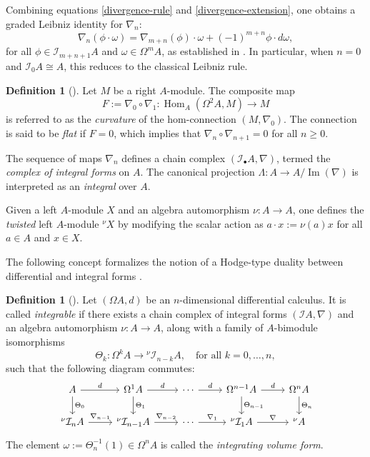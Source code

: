 \documentclass{amsart}
\theoremstyle{definition}
\newtheorem{definition}[theorem]{Definition}
\theoremstyle{remark}
\numberwithin{equation}{section}
\begin{document}
Combining equations \eqref{divergence-rule} and \eqref{divergence-extension}, one obtains a graded Leibniz identity for $\nabla_n$:
\begin{equation}
    \nabla_n(\phi \cdot \omega) = \nabla_{m+n}(\phi) \cdot \omega + (-1)^{m+n} \phi \cdot d\omega,
\end{equation}
for all $\phi \in \mathcal{I}_{m+n+1} A$ and $\omega \in \Omega^m A$, as established in \cite[Lemma 3.2]{Brzezinski2008}. In particular, when $n = 0$ and $\mathcal{I}_0 A \cong A$, this reduces to the classical Leibniz rule.

\begin{definition}[{\cite[Definition 3.4]{Brzezinski2008}}]
Let $M$ be a right $A$-module. The composite map 
\[
F := \nabla_0 \circ \nabla_1: \operatorname{Hom}_A(\Omega^2 A, M) \to M
\]
is referred to as the \emph{curvature} of the hom-connection $(M, \nabla_0)$. The connection is said to be \emph{flat} if $F = 0$, which implies that $\nabla_n \circ \nabla_{n+1} = 0$ for all $n \geq 0$.
\end{definition}

The sequence of maps $\nabla_n$ defines a chain complex $(\mathcal{I}_\bullet A, \nabla)$, termed the \emph{complex of integral forms} on $A$. The canonical projection $\Lambda: A \to A / \operatorname{Im}(\nabla)$ is interpreted as an \emph{integral} over $A$.

Given a left $A$-module $X$ and an algebra automorphism $\nu: A \to A$, one defines the \emph{twisted} left $A$-module ${}^{\nu} X$ by modifying the scalar action as $a \cdot x := \nu(a) x$ for all $a \in A$ and $x \in X$.

The following concept formalizes the notion of a Hodge-type duality between differential and integral forms \cite[p.~112]{Brzezinski2015}.

\begin{definition}[{\cite[Definition 2.1]{BrzezinskiSitarz2017}}]
Let $(\Omega A, d)$ be an $n$-dimensional differential calculus. It is called \emph{integrable} if there exists a chain complex of integral forms $(\mathcal{I} A, \nabla)$ and an algebra automorphism $\nu: A \to A$, along with a family of $A$-bimodule isomorphisms
\[
\Theta_k: \Omega^k A \to {}^{\nu} \mathcal{I}_{n - k} A, \quad \text{for all } k = 0, \dotsc, n,
\]
such that the following diagram commutes:
\[
\begin{tikzcd}
A \arrow{r}{d} \arrow{d}{\Theta_0} & \Omega^{1} A \arrow{r}{d} \arrow{d}{\Theta_1} & \dotsb \arrow{r}{d} & \Omega^{n-1} A \arrow{r}{d} \arrow{d}{\Theta_{n-1}} & \Omega^n A \arrow{d}{\Theta_n} \\
{}^{\nu} \mathcal{I}_n A \arrow{r}{\nabla_{n-1}} & {}^{\nu} \mathcal{I}_{n-1} A \arrow{r}{\nabla_{n-2}} & \dotsb \arrow{r}{\nabla_1} & {}^{\nu} \mathcal{I}_1 A \arrow{r}{\nabla} & {}^{\nu} A
\end{tikzcd}
\]
The element $\omega := \Theta_n^{-1}(1) \in \Omega^n A$ is called the \emph{integrating volume form}.
\end{definition}
\end{document}
